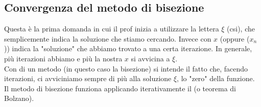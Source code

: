 \newpage
\subsection{Convergenza del metodo di bisezione}
Questa è la prima domanda in cui il prof inizia a utilizzare la lettera $\xi$ (csi), che semplicemente indica la soluzione che stiamo cercando. Invece con $x$ (oppure ($x_n$)) indica la "soluzione" che abbiamo trovato a una certa iterazione. In generale, più iterazioni abbiamo e più la nostra $x$ si avvicina a $\xi$.\\
Con  di un metodo (in questo caso la bisezione) si intende il fatto che, facendo iterazioni, ci avviciniamo sempre di più alla soluzione $\xi$, lo "zero" della funzione.\\
Il metodo di bisezione funziona applicando iterativamente il  (o teorema di Bolzano).

